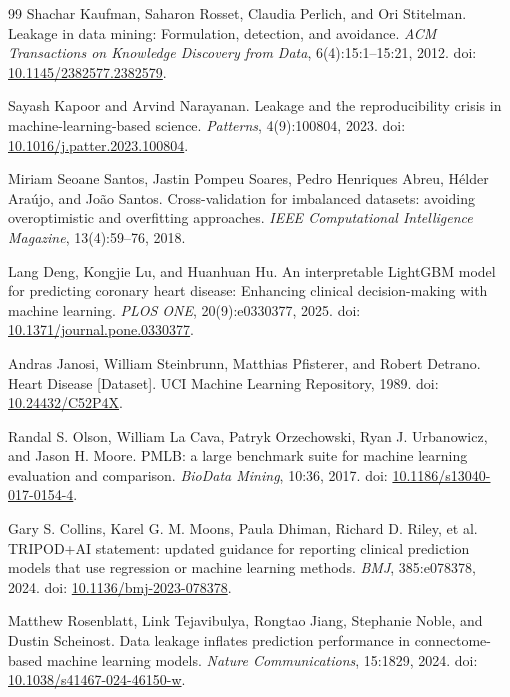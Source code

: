 \begin{thebibliography}{99}
 Shachar Kaufman, Saharon Rosset, Claudia Perlich, and Ori Stitelman. Leakage in data mining: Formulation, detection, and avoidance. \emph{ACM Transactions on Knowledge Discovery from Data}, 6(4):15:1--15:21, 2012. doi: \href{https://doi.org/10.1145/2382577.2382579}{10.1145/2382577.2382579}.

 Sayash Kapoor and Arvind Narayanan. Leakage and the reproducibility crisis in machine-learning-based science. \emph{Patterns}, 4(9):100804, 2023. doi: \href{https://doi.org/10.1016/j.patter.2023.100804}{10.1016/j.patter.2023.100804}.

 Miriam Seoane Santos, Jastin Pompeu Soares, Pedro Henriques Abreu, H\'{e}lder Ara\'{u}jo, and Jo\~{a}o Santos. Cross-validation for imbalanced datasets: avoiding overoptimistic and overfitting approaches. \emph{IEEE Computational Intelligence Magazine}, 13(4):59--76, 2018.

 Lang Deng, Kongjie Lu, and Huanhuan Hu. An interpretable LightGBM model for predicting coronary heart disease: Enhancing clinical decision-making with machine learning. \emph{PLOS ONE}, 20(9):e0330377, 2025. doi: \href{https://doi.org/10.1371/journal.pone.0330377}{10.1371/journal.pone.0330377}.

 Andras Janosi, William Steinbrunn, Matthias Pfisterer, and Robert Detrano. Heart Disease [Dataset]. UCI Machine Learning Repository, 1989. doi: \href{https://doi.org/10.24432/C52P4X}{10.24432/C52P4X}.

 Randal S. Olson, William La Cava, Patryk Orzechowski, Ryan J. Urbanowicz, and Jason H. Moore. PMLB: a large benchmark suite for machine learning evaluation and comparison. \emph{BioData Mining}, 10:36, 2017. doi: \href{https://doi.org/10.1186/s13040-017-0154-4}{10.1186/s13040-017-0154-4}.

 Gary S. Collins, Karel G. M. Moons, Paula Dhiman, Richard D. Riley, et al. TRIPOD+AI statement: updated guidance for reporting clinical prediction models that use regression or machine learning methods. \emph{BMJ}, 385:e078378, 2024. doi: \href{https://doi.org/10.1136/bmj-2023-078378}{10.1136/bmj-2023-078378}.

 Matthew Rosenblatt, Link Tejavibulya, Rongtao Jiang, Stephanie Noble, and Dustin Scheinost. Data leakage inflates prediction performance in connectome-based machine learning models. \emph{Nature Communications}, 15:1829, 2024. doi: \href{https://doi.org/10.1038/s41467-024-46150-w}{10.1038/s41467-024-46150-w}.


\end{thebibliography}
